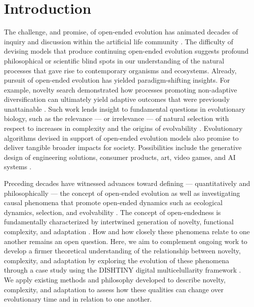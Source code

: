 \section{Introduction}

The challenge, and promise, of open-ended evolution has animated decades of inquiry and discussion within the artificial life community \citep{packard2019overview}.
The difficulty of devising models that produce continuing open-ended evolution suggests profound philosophical or scientific blind spots in our understanding of the natural processes that gave rise to contemporary organisms and ecosystems.
Already, pursuit of open-ended evolution has yielded paradigm-shifting insights.
For example, novelty search demonstrated how processes promoting non-adaptive diversification can ultimately yield adaptive outcomes that were previously unattainable \citep{lehman2011abandoning}.
Such work lends insight to fundamental questions in evolutionary biology, such as the relevance --- or irrelevance --- of natural selection with respect to increases in complexity \citep{lehman2012evolution, Lynch8597} and the origins of evolvability \citep{lehman2013evolvability,Kirschner8420}.
Evolutionary algorithms devised in support of open-ended evolution models also promise to deliver tangible broader impacts for society.
Possibilities include the generative design of engineering solutions, consumer products, art, video games, and AI systems \citep{nguyen2015,stanley2017open}.

Preceding decades have witnessed advances toward defining --- quantitatively and philosophically --- the concept of open-ended evolution \citep{lehman2012beyond,dolson2019modes,bedau1998classification} as well as investigating causal phenomena that promote open-ended dynamics such as ecological dynamics, selection, and evolvability \citep{dolson2019constructive,soros2014identifying,huizinga2018emergence}.
The concept of open-endedness is fundamentally characterized by intertwined generation of novelty, functional complexity, and adaptation \citep{taylor2016open}.
How and how closely these phenomena relate to one another remains an open question.
Here, we aim to complement ongoing work to develop a firmer theoretical understanding of the relationship between novelty, complexity, and adaptation by exploring the evolution of these phenomena through a case study using the DISHTINY digital multicelullarity framework \citep{moreno2019toward}.
We apply existing methods and philosophy developed to describe novelty, complexity, and adaptation to assess how these qualities can change over evolutionary time and in relation to one another.
